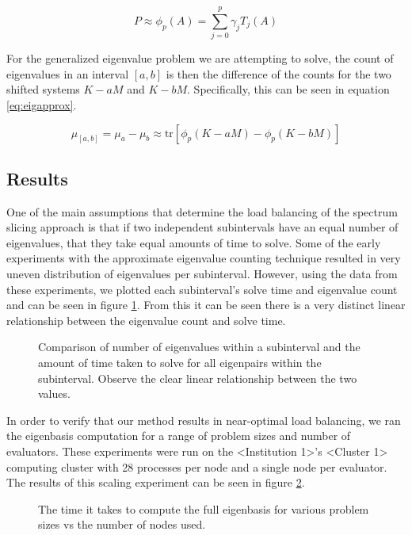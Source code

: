 \begin{equation}
\label{eq:polyfilter}
	P \approx \phi_p(A) = \sum_{j=0}^{p} \gamma_j T_j(A)
\end{equation}

For the generalized eigenvalue problem we are attempting to solve, the count of eigenvalues in an interval $[a,b]$ is then the difference of the counts for the two shifted systems $K-aM$ and $K-bM$. Specifically, this can be seen in equation \eqref{eq:eigapprox}.

\begin{equation}
\label{eq:eigapprox}
	\mu_{[a,b]} = \mu_a - \mu_b \approx \text{tr}[\phi_p (K-aM) - \phi_p (K-bM)]
\end{equation}

\subsection{Results}

One of the main assumptions that determine the load balancing of the spectrum slicing approach is that if two independent subintervals have an equal number of eigenvalues, that they take equal amounts of time to solve. Some of the early experiments with the approximate eigenvalue counting technique resulted in very uneven distribution of eigenvalues per subinterval. However, using the data from these experiments, we plotted each subinterval's solve time and eigenvalue count and can be seen in figure \ref{fig:solvetime_vs_count}. From this it can be seen there is a very distinct linear relationship between the eigenvalue count and solve time.

\begin{figure}
	\caption{Comparison of number of eigenvalues within a subinterval and the amount of time taken to solve for all eigenpairs within the subinterval. Observe the clear linear relationship between the two values.}
	\label{fig:solvetime_vs_count}
	
\end{figure}

In order to verify that our method results in near-optimal load balancing, we ran the eigenbasis computation for a range of problem sizes and number of evaluators. These experiments were run on the <Institution 1>'s <Cluster 1> computing cluster with 28 processes per node and a single node per evaluator. The results of this scaling experiment can be seen in figure \ref{fig:scaling}.

\begin{figure}
	\caption{The time it takes to compute the full eigenbasis for various problem sizes vs the number of nodes used.}
	\label{fig:scaling}
	
\end{figure}

